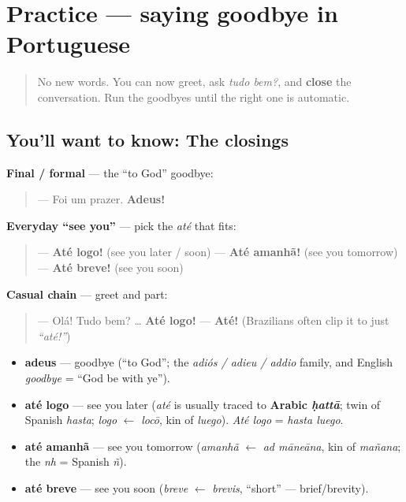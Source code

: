 \section[Practice]{Practice — saying goodbye in Portuguese}

\label{lesson:PT-C04-practice}



\begin{quote}
No new words. You can now greet, ask \emph{tudo bem?}, and \textbf{close} the conversation. Run the goodbyes until the right one is automatic.
\end{quote}

\subsection*{You'll want to know: The closings}
\textbf{Final / formal} — the \textquotedblleft{}to God\textquotedblright{} goodbye:

\begin{quote}
— Foi um prazer. \textbf{Adeus!}
\end{quote}

\textbf{Everyday \textquotedblleft{}see you\textquotedblright{}} — pick the \emph{até} that fits:

\begin{quote}
— \textbf{Até logo!} (see you later / soon) — \textbf{Até amanhã!} (see you tomorrow) — \textbf{Até breve!} (see you soon)
\end{quote}

\textbf{Casual chain} — greet and part:

\begin{quote}
— Olá! Tudo bem? … \textbf{Até logo!} — \textbf{Até!} (Brazilians often clip it to just \emph{\textquotedblleft{}até!\textquotedblright{}})
\end{quote}

\begin{grammarlens}[title={What you've built this chapter}]
\begin{itemize}
\raggedright
  \item \textbf{adeus} — goodbye (\textquotedblleft{}to God\textquotedblright{}; the \emph{adiós / adieu / addio} family, and English \emph{goodbye} = \textquotedblleft{}God be with ye\textquotedblright{}).
  \item \textbf{até logo} — see you later (\emph{até} is usually traced to \textbf{Arabic \emph{ḥattā}}; twin of Spanish \emph{hasta}; \emph{logo} $\leftarrow$ \emph{locō}, kin of \emph{luego}). \emph{Até logo} = \emph{hasta luego}.
  \item \textbf{até amanhã} — see you tomorrow (\emph{amanhã} $\leftarrow$ \emph{ad māneāna}, kin of \emph{mañana}; the \emph{nh} = Spanish \emph{ñ}).
  \item \textbf{até breve} — see you soon (\emph{breve} $\leftarrow$ \emph{brevis}, \textquotedblleft{}short\textquotedblright{} — brief/brevity).
\end{itemize}
\end{grammarlens}

